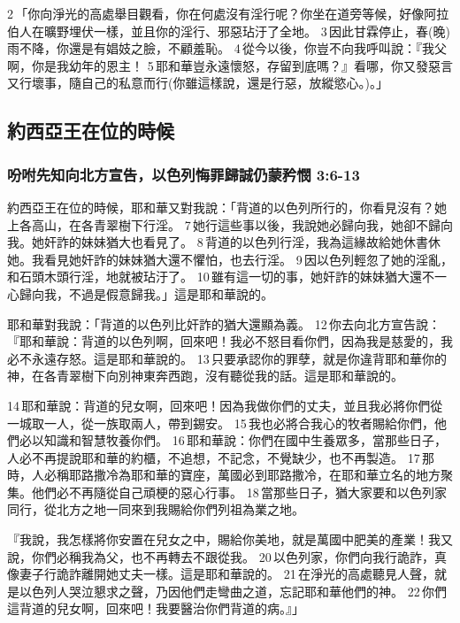 2 「你向淨光的高處舉目觀看，你在何處沒有淫行呢？你坐在道旁等候，好像阿拉伯人在曠野埋伏一樣，並且你的淫行、邪惡玷汙了全地。 3 因此甘霖停止，春(晚)雨不降，你還是有娼妓之臉，不顧羞恥。 4 從今以後，你豈不向我呼叫說：『我父啊，你是我幼年的恩主！ 5 耶和華豈永遠懷怒，存留到底嗎？』看哪，你又發惡言又行壞事，隨自己的私意而行(你雖這樣說，還是行惡，放縱慾心。)。」

\subsection{約西亞王在位的時候}
\subsubsection{吩咐先知向北方宣告，以色列悔罪歸誠仍蒙矜憫 3:6-13}
約西亞王在位的時候，耶和華又對我說：「背道的以色列所行的，你看見沒有？她上各高山，在各青翠樹下行淫。 7 她行這些事以後，我說她必歸向我，她卻不歸向我。她奸詐的妹妹猶大也看見了。 8 背道的以色列行淫，我為這緣故給她休書休她。我看見她奸詐的妹妹猶大還不懼怕，也去行淫。 9 因以色列輕忽了她的淫亂，和石頭木頭行淫，地就被玷汙了。 10 雖有這一切的事，她奸詐的妹妹猶大還不一心歸向我，不過是假意歸我。」這是耶和華說的。


耶和華對我說：「背道的以色列比奸詐的猶大還顯為義。 12 你去向北方宣告說：『耶和華說：背道的以色列啊，回來吧！我必不怒目看你們，因為我是慈愛的，我必不永遠存怒。這是耶和華說的。 13 只要承認你的罪孽，就是你違背耶和華你的神，在各青翠樹下向別神東奔西跑，沒有聽從我的話。這是耶和華說的。 

14 耶和華說：背道的兒女啊，回來吧！因為我做你們的丈夫，並且我必將你們從一城取一人，從一族取兩人，帶到錫安。 15 我也必將合我心的牧者賜給你們，他們必以知識和智慧牧養你們。 16 耶和華說：你們在國中生養眾多，當那些日子，人必不再提說耶和華的約櫃，不追想，不記念，不覺缺少，也不再製造。 17 那時，人必稱耶路撒冷為耶和華的寶座，萬國必到耶路撒冷，在耶和華立名的地方聚集。他們必不再隨從自己頑梗的惡心行事。 18 當那些日子，猶大家要和以色列家同行，從北方之地一同來到我賜給你們列祖為業之地。


『我說，我怎樣將你安置在兒女之中，賜給你美地，就是萬國中肥美的產業！我又說，你們必稱我為父，也不再轉去不跟從我。 20 以色列家，你們向我行詭詐，真像妻子行詭詐離開她丈夫一樣。這是耶和華說的。 21 在淨光的高處聽見人聲，就是以色列人哭泣懇求之聲，乃因他們走彎曲之道，忘記耶和華他們的神。 22 你們這背道的兒女啊，回來吧！我要醫治你們背道的病。』」

